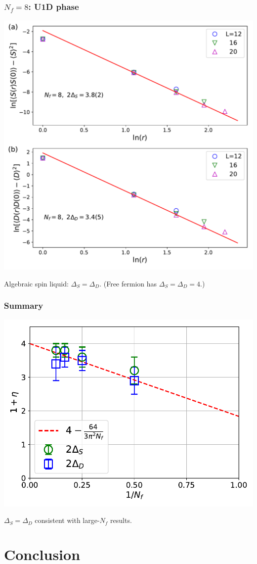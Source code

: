 \documentclass[xcolor=table, 10pt, aspectratio=169]{beamer}
\begin{document}
\begin{frame}
  \frametitle{$N_f=8$: U1D phase}
  \begin{center}
    \includegraphics[width=.5\textwidth]{n8decay}
  \end{center}
  Algebraic spin liquid: $\Delta_S = \Delta_D$.
  (Free fermion has $\Delta_S=\Delta_D = 4$.)
\end{frame}

\begin{frame}
  \frametitle{Summary}
  \begin{center}
    \includegraphics[width=.8\textwidth]{eta}
  \end{center}
  $\Delta_S=\Delta_D$ consistent with large-$N_f$ results.
\end{frame}

\section{Conclusion}
\end{document}
